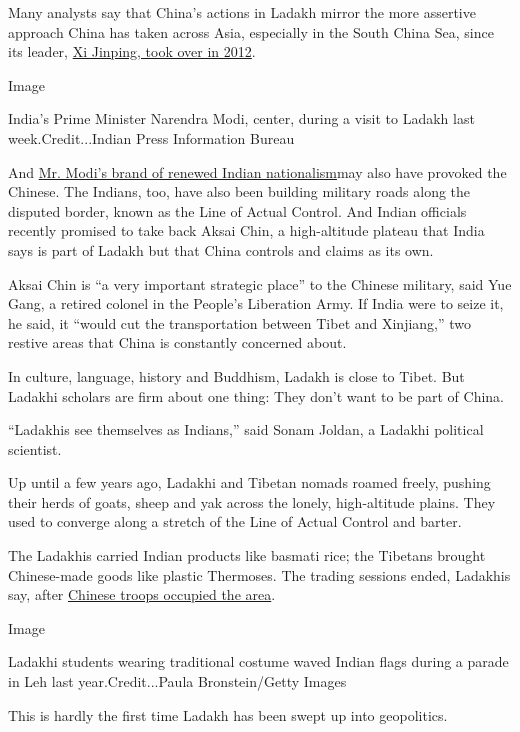 Many analysts say that China's actions in Ladakh mirror the more
assertive approach China has taken across Asia, especially in the South
China Sea, since its leader,
\href{https://www.nytimes.com/2013/03/15/world/asia/chinas-new-leader-xi-jinping-takes-full-power.html}{Xi
Jinping, took over in 2012}.

Image

India's Prime Minister Narendra Modi, center, during a visit to Ladakh
last week.Credit...Indian Press Information Bureau

And
\href{https://www.nytimes.com/2020/06/17/world/asia/china-india-border.html}{Mr.
Modi's brand of renewed Indian nationalism}may also have provoked the
Chinese. The Indians, too, have also been building military roads along
the disputed border, known as the Line of Actual Control. And Indian
officials recently promised to take back Aksai Chin, a high-altitude
plateau that India says is part of Ladakh but that China controls and
claims as its own.

Aksai Chin is ``a very important strategic place'' to the Chinese
military, said Yue Gang, a retired colonel in the People's Liberation
Army. If India were to seize it, he said, it ``would cut the
transportation between Tibet and Xinjiang,'' two restive areas that
China is constantly concerned about.

In culture, language, history and Buddhism, Ladakh is close to Tibet.
But Ladakhi scholars are firm about one thing: They don't want to be
part of China.

``Ladakhis see themselves as Indians,'' said Sonam Joldan, a Ladakhi
political scientist.

Up until a few years ago, Ladakhi and Tibetan nomads roamed freely,
pushing their herds of goats, sheep and yak across the lonely,
high-altitude plains. They used to converge along a stretch of the Line
of Actual Control and barter.

The Ladakhis carried Indian products like basmati rice; the Tibetans
brought Chinese-made goods like plastic Thermoses. The trading sessions
ended, Ladakhis say, after
\href{https://www.indiatoday.in/india/north/story/chinese-army-occupied-640-square-km-three-ladakh-sectors-report-209992-2013-09-05}{Chinese
troops occupied the area}.

Image

Ladakhi students wearing traditional costume waved Indian flags during a
parade in Leh last year.Credit...Paula Bronstein/Getty Images

This is hardly the first time Ladakh has been swept up into geopolitics.

